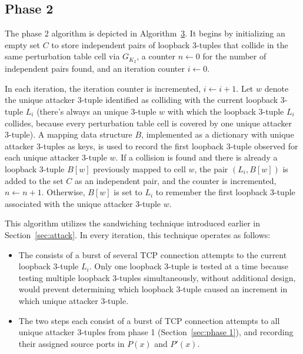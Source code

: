 \documentclass[twocolumn]{report}
\begin{document}
\vspace{0.2cm}


\subsection{Phase 2}
\label{sec:phase 2}

The phase 2 algorithm is depicted in Algorithm~\hyperref[alg:phase2]{3}. It begins by initializing an empty set $C$ to store \alert{independent pairs of loopback 3-tuples} that collide in the same perturbation table cell via $G_{K_2}$, a counter $n \leftarrow 0$ for the \alert{number of independent pairs found}, and an \alert{iteration counter} $i \leftarrow 0$.

In each iteration, the iteration counter is incremented, \(i \leftarrow i+1\). Let \(w\) denote the unique attacker 3-tuple identified as colliding with the current loopback 3-tuple \(L_i\) (there's always an unique 3-tuple \(w\) with which the loopback 3-tuple $L_i$ collides, because every perturbation table cell is covered by one unique attacker 3-tuple). A mapping data structure \(B\), implemented as a \alert{dictionary} with unique attacker 3-tuples as keys, is used to record the first loopback 3-tuple observed for each unique attacker 3-tuple \(w\). \alert{If a collision is found} and there is already a loopback 3-tuple \(B[w]\) previously mapped to cell \(w\), the pair \((L_i, B[w])\) is added to the set \(C\) as an independent pair, and the counter is incremented, \(n \leftarrow n+1\). \alert{Otherwise}, \(B[w]\) is set to \(L_i\) to remember the first loopback 3-tuple associated with the unique attacker 3-tuple \(w\).

This algorithm utilizes the \alert{sandwiching technique} introduced earlier in Section~\ref{sec:attack}. In every iteration, this technique operates as follows:
\begin{itemize}
	\item The  consists of a burst of several TCP connection attempts to the current loopback 3-tuple $L_i$. Only one loopback 3-tuple is tested at a time because testing multiple loopback 3-tuples simultaneously, without additional design, would prevent determining which loopback 3-tuple caused an increment in which unique attacker 3-tuple.
	\item The two  steps each consist of a burst of TCP connection attempts to all unique attacker 3-tuples from phase 1 (Section~\ref{sec:phase 1}), and recording their assigned source ports in $P(x)$ and $P'(x)$.
\end{itemize}
\end{document}
